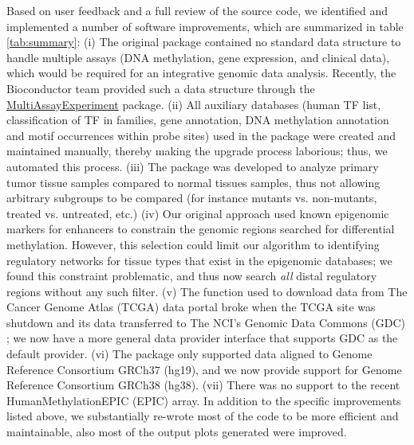 Based on user feedback and a full review of the source code, we identified and implemented a number of software improvements, which are summarized in table \ref{tab:summary}: (i) The original package contained no standard data structure to handle multiple assays (DNA methylation, gene expression, and clinical data), which would be required for an integrative genomic data analysis. Recently, the Bioconductor team provided such a data structure through the \href{http://bioconductor.org/packages/MultiAssayExperiment/}{MultiAssayExperiment} package. (ii) All auxiliary databases (human TF list, classification of TF in families, gene annotation, DNA methylation annotation and motif occurrences within probe sites) used in the package were created and maintained manually, thereby making the upgrade process laborious; thus, we automated this process. (iii) The package was developed to analyze primary tumor tissue samples compared to normal tissues samples, thus not allowing arbitrary subgroups to be compared (for instance mutants vs. non-mutants, treated vs. untreated, etc.) (iv) Our original approach used known epigenomic markers for enhancers to constrain the genomic regions searched for differential methylation. However, this selection could limit our algorithm to identifying regulatory networks for tissue types that exist in the epigenomic databases; we found this constraint problematic, and thus now search \textit{all} distal regulatory regions without any such filter. (v) The function used to download data from The Cancer Genome Atlas (TCGA) data portal \cite{tomczak2015cancer} broke when the TCGA site was shutdown and its data transferred to The NCI's Genomic Data Commons (GDC) \cite{grossman2016toward}; we now have a more general data provider interface that supports GDC as the default provider. (vi) The package only supported data aligned to Genome Reference Consortium GRCh37 (hg19), and we now provide support for Genome Reference Consortium GRCh38 (hg38). (vii) There was no support to the recent HumanMethylationEPIC (EPIC) array. In addition to the specific improvements listed above, we substantially re-wrote most of the code to be more efficient and maintainable,  also most of the output plots generated were improved.

\bgroup
\def\arraystretch{2.0}%

